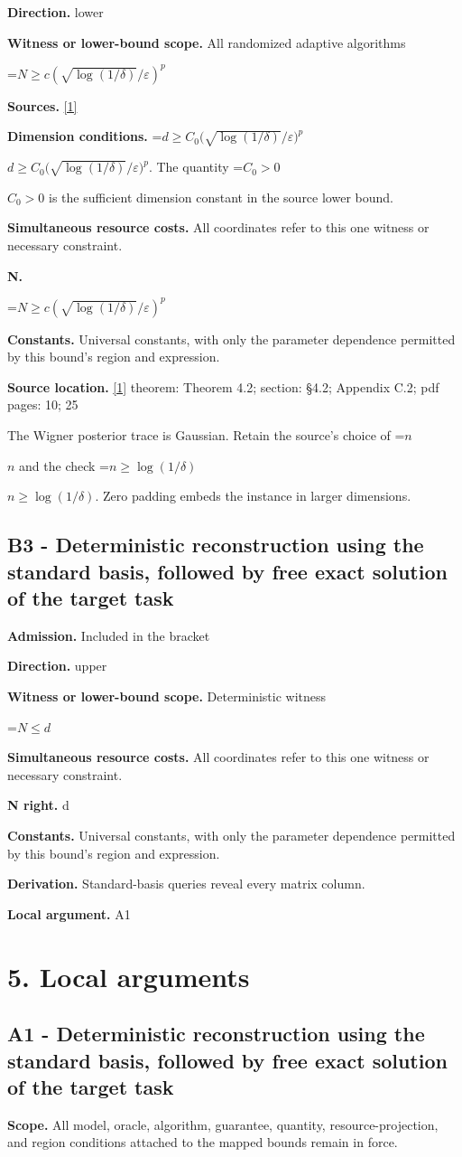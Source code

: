 \documentclass[10pt,a4paper]{article}
\newcommand{\AtlasMath}[1]{\par\begingroup\centering\setbox0=\hbox{$\displaystyle #1$}\ifdim\wd0>1.4\linewidth\typeout{ATLAS WIDE FORMULA: \the\wd0}\fi\ifdim\wd0>\linewidth\resizebox{\linewidth}{!}{\box0}\else\box0\fi\par\endgroup}
\newcommand{\AtlasInlineMath}[1]{\begingroup\setbox0=\hbox{$#1$}\ifdim\wd0>.4\linewidth\endgroup\AtlasMath{#1}\else\endgroup$#1$\fi}
\begin{document}
\textbf{Direction.} lower

\textbf{Witness or lower-bound scope.} All randomized adaptive algorithms

\AtlasMath{N\ge c(\sqrt{\log(1/\delta)}/\varepsilon)^p}
\textbf{Sources.} \href{https://arxiv.org/pdf/2209.15219v1}{[1]}

\textbf{Dimension conditions.} \AtlasInlineMath{d\ge C_0\bigl(\sqrt{\log(1/\delta)}/\varepsilon\bigr)^p}. The quantity \AtlasInlineMath{C_0>0} is the sufficient dimension constant in the source lower bound.

\textbf{Simultaneous resource costs.} All coordinates refer to this one witness or necessary constraint.

\textbf{N.}

\AtlasMath{N\ge c(\sqrt{\log(1/\delta)}/\varepsilon)^p}
\textbf{Constants.} Universal constants, with only the parameter dependence permitted by this bound’s region and expression.

\textbf{Source location.} \href{https://arxiv.org/pdf/2209.15219v1}{[1]} theorem: Theorem 4.2; section: §4.2; Appendix C.2; pdf pages: 10; 25

The Wigner posterior trace is Gaussian. Retain the source's choice of \AtlasInlineMath{n} and the check \AtlasInlineMath{n\ge\log(1/\delta)}. Zero padding embeds the instance in larger dimensions.

\subsection{B3 - Deterministic reconstruction using the standard basis, followed by free exact solution of the target task}
\textbf{Admission.} Included in the bracket

\textbf{Direction.} upper

\textbf{Witness or lower-bound scope.} Deterministic witness

\AtlasMath{N\le d}
\textbf{Simultaneous resource costs.} All coordinates refer to this one witness or necessary constraint.

\textbf{N right.} d

\textbf{Constants.} Universal constants, with only the parameter dependence permitted by this bound’s region and expression.

\textbf{Derivation.} Standard-basis queries reveal every matrix column.

\textbf{Local argument.} A1

\section{5. Local arguments}
\subsection{A1 - Deterministic reconstruction using the standard basis, followed by free exact solution of the target task}
\textbf{Scope.} All model, oracle, algorithm, guarantee, quantity, resource-projection, and region conditions attached to the mapped bounds remain in force.
\end{document}
